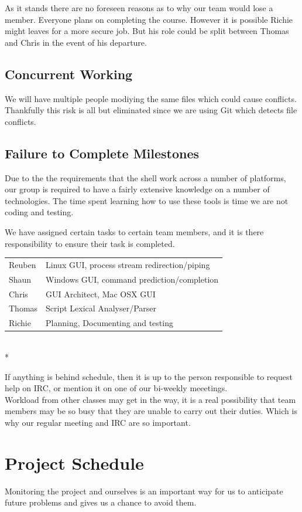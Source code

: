 \documentclass[a4paper,12pt]{article}
\begin{document}
As it stands there are no foreseen reasons as to why our team would lose a member. Everyone plans on completing the course. However it is possible Richie might leaves for a more secure job. But his role  could be split between Thomas and Chris in the event of his departure. 

\subsection*{Concurrent Working}
We will have multiple people modiying the same files which could cause conflicts. Thankfully this risk is all but eliminated since we are using Git which detects file conflicts.

\subsection*{Failure to Complete Milestones}
Due to the the requirements that the shell work across a number of platforms, our group is required to have a fairly extensive knowledge on a number of technologies. The time spent learning how to use these tools is time we are not coding and testing.

We have assigned certain tasks to certain team members, and it is there responsibility to ensure their task is completed.\\

\begin{tabular}{l l}
  Reuben & Linux GUI,  process stream redirection/piping \\
  Shaun & Windows GUI, command prediction/completion \\
  Chris & GUI Architect, Mac OSX GUI \\
  Thomas & Script Lexical Analyser/Parser \\
  Richie & Planning, Documenting and testing \\
\end{tabular}\\*

If anything is behind schedule, then it is up to the person responsible to request help on IRC, or mention it on one of our bi-weekly meeetings.\\

Workload from other classes may get in the way, it is a real possibility that team members may be so busy that they are unable to carry out their duties. Which is why our regular meeting and IRC are so important.
\pagebreak
\section*{Project Schedule}
Monitoring the project and ourselves is an important way for us to anticipate future problems and gives us a chance to avoid them.
\end{document}
